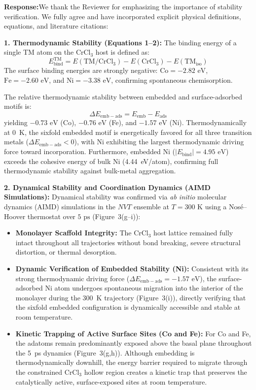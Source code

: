 \documentclass[11pt, sans, a4paper]{moderncv}
\newcommand{\response}{\vspace{0.4em}\noindent\textbf{\color{actionblue}Response:}\hspace{0.5em}}
\begin{document}
\response We thank the Reviewer for emphasizing the importance of stability verification. We fully agree and have incorporated explicit physical definitions, equations, and literature citations:

\noindent\textbf{1. Thermodynamic Stability (Equations 1--2):}
The binding energy of a single TM atom on the $\text{CrCl}_3$ host is defined as:
\begin{equation}
E_{\mathrm{bind}}^{\mathrm{TM}} = E(\mathrm{TM}/\mathrm{CrCl}_3) - E(\mathrm{CrCl}_3) - E(\mathrm{TM}_{\mathrm{iso}})
\end{equation}
The surface binding energies are strongly negative: $\text{Co} = -2.82\text{ eV}$, $\text{Fe} = -2.60\text{ eV}$, and $\text{Ni} = -3.38\text{ eV}$, confirming spontaneous chemisorption.

The relative thermodynamic stability between embedded and surface-adsorbed motifs is:
\begin{equation}
\Delta E_{\mathrm{emb-ads}} = E_{\mathrm{emb}} - E_{\mathrm{ads}}
\end{equation}
yielding $-0.73\text{ eV}$ (Co), $-0.76\text{ eV}$ (Fe), and $-1.57\text{ eV}$ (Ni). Thermodynamically at 0~K, the sixfold embedded motif is energetically favored for all three transition metals ($\Delta E_{\mathrm{emb-ads}} < 0$), with Ni exhibiting the largest thermodynamic driving force toward incorporation. Furthermore, embedded Ni ($|E_{\mathrm{bind}}| = 4.95\text{ eV}$) exceeds the cohesive energy of bulk Ni (4.44~eV/atom), confirming full thermodynamic stability against bulk-metal aggregation.

\noindent\textbf{2. Dynamical Stability and Coordination Dynamics (AIMD Simulations):}
Dynamical stability was confirmed via \textit{ab initio} molecular dynamics (AIMD) simulations in the $NVT$ ensemble at $T = 300\text{ K}$ using a Nosé--Hoover thermostat over $5\text{ ps}$ (Figure~3(g--i)):
\begin{itemize}[leftmargin=1.5em, itemsep=0.2em]
\item \textbf{Monolayer Scaffold Integrity:} The $\text{CrCl}_3$ host lattice remained fully intact throughout all trajectories without bond breaking, severe structural distortion, or thermal desorption.
\item \textbf{Dynamic Verification of Embedded Stability (Ni):} Consistent with its strong thermodynamic driving force ($\Delta E_{\mathrm{emb-ads}} = -1.57\text{ eV}$), the surface-adsorbed Ni atom undergoes spontaneous migration into the interior of the monolayer during the 300~K trajectory (Figure~3(i)), directly verifying that the sixfold embedded configuration is dynamically accessible and stable at room temperature.
\item \textbf{Kinetic Trapping of Active Surface Sites (Co and Fe):} For Co and Fe, the adatoms remain predominantly exposed above the basal plane throughout the 5~ps dynamics (Figure~3(g,h)). Although embedding is thermodynamically downhill, the energy barrier required to migrate through the constrained CrCl$_3$ hollow region creates a kinetic trap that preserves the catalytically active, surface-exposed sites at room temperature.
\end{itemize}
\end{document}
